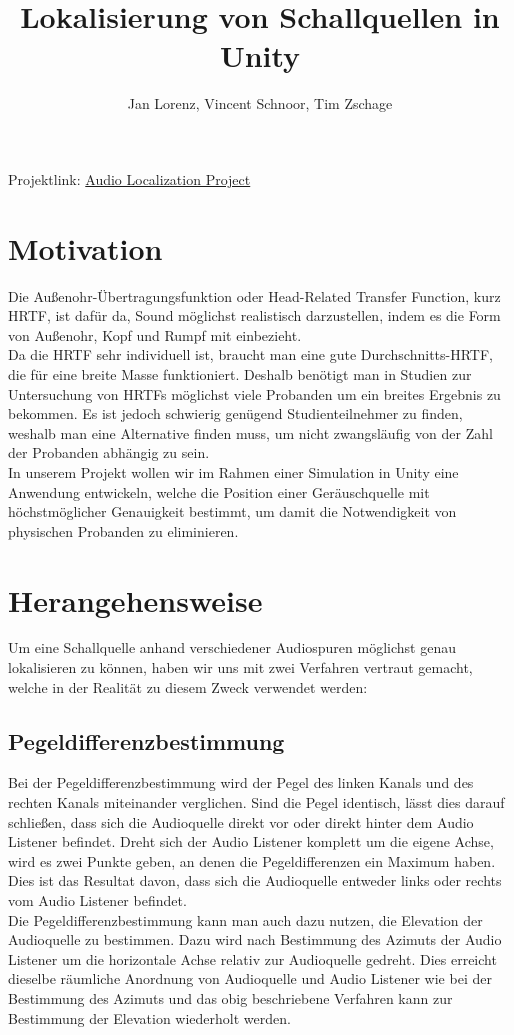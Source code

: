 \documentclass[12pt,a4paper]{article}
\author{Jan Lorenz, Vincent Schnoor, Tim Zschage}
\title{Lokalisierung von Schallquellen in Unity}
\begin{document}
\maketitle
\begin{center}
Projektlink: \href{https://github.com/TheCanadians/AudioLocalization}{Audio Localization Project}
\end{center}

\section{Motivation}
Die Außenohr-Übertragungsfunktion oder Head-Related Transfer Function, kurz HRTF, ist dafür da, Sound möglichst realistisch darzustellen, indem es die Form von Außenohr, Kopf und Rumpf mit einbezieht.\\
Da die HRTF sehr individuell ist, braucht man eine gute Durchschnitts-HRTF, die für eine breite Masse funktioniert. Deshalb benötigt man in Studien zur Untersuchung von HRTFs möglichst viele Probanden um ein breites Ergebnis zu bekommen. Es ist jedoch schwierig genügend Studienteilnehmer zu finden, weshalb man eine Alternative finden muss, um nicht zwangsläufig von der Zahl der Probanden abhängig zu sein.\\
In unserem Projekt wollen wir im Rahmen einer Simulation in Unity eine Anwendung entwickeln, welche die Position einer Geräuschquelle mit höchstmöglicher Genauigkeit bestimmt, um damit die Notwendigkeit von physischen Probanden zu eliminieren.

\section{Herangehensweise}
Um eine Schallquelle anhand verschiedener Audiospuren möglichst genau lokalisieren zu können, haben wir uns mit zwei Verfahren vertraut gemacht, welche in der Realität zu diesem Zweck verwendet werden:

\subsection{Pegeldifferenzbestimmung}
Bei der Pegeldifferenzbestimmung wird der Pegel des linken Kanals und des rechten Kanals miteinander verglichen. Sind die Pegel identisch, lässt dies darauf schließen, dass sich die Audioquelle direkt vor oder direkt hinter dem Audio Listener befindet. Dreht sich der Audio Listener komplett um die eigene Achse, wird es zwei Punkte geben, an denen die Pegeldifferenzen ein Maximum haben. Dies ist das Resultat davon, dass sich die Audioquelle entweder links oder rechts vom Audio Listener befindet.\\ 
Die Pegeldifferenzbestimmung kann man auch dazu nutzen, die Elevation der Audioquelle zu bestimmen. Dazu wird nach Bestimmung des Azimuts der Audio Listener um die horizontale Achse relativ zur Audioquelle gedreht. Dies erreicht dieselbe räumliche Anordnung von Audioquelle und Audio Listener wie bei der Bestimmung des Azimuts und das obig beschriebene Verfahren kann zur Bestimmung der Elevation wiederholt werden. 
\end{document}
